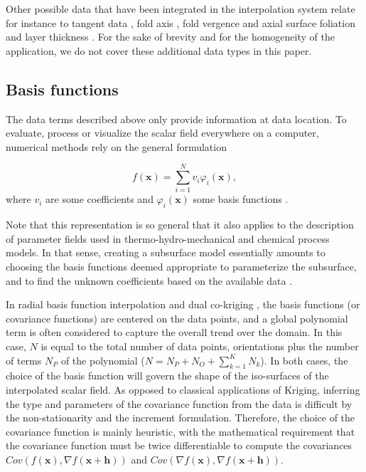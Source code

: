 \documentclass[preprint]{ring20}
\newcommand{\bx}{\mathbf{x}}
\begin{document}
Other possible data that have been integrated in the interpolation system relate for instance to tangent data \citep{Lajaunie1997MG, Caumon2013GaRSITo, Hillier2014MG}, fold axis \citep{MassiotGM2010,Hillier2014MG}, fold vergence and axial surface foliation \citep{Laurent2016EaPSL,Grose2017JSG} and layer thickness \citep{Laurent2016MG}. For the sake of brevity and for the homogeneity of the application, we do not cover these additional data types in this paper. 

\subsection{Basis functions} 

The data terms described above only provide information at data location. To evaluate, process or visualize the scalar field everywhere on a computer, numerical methods rely on the general formulation 

\begin{equation}
\label{eq:basis}
  f(\mathbf{x}) = \sum_{i=1}^{N}{v_i\varphi_i(\mathbf{x})},
\end{equation}
\noindent where $v_i$ are some coefficients and $\varphi_i(\mathbf{x})$ some basis functions \citep[e.g., ][]{Hillier2014MG,Renaudeau2019MG}.

Note that this representation is so general that it also applies to the description of parameter fields used in thermo-hydro-mechanical and chemical process models. 
In that sense, creating a subsurface model essentially amounts to choosing the basis functions deemed appropriate to parameterize the subsurface, and to find the unknown coefficients based on the available data \citep{Caumon2018HoMG,Wellmann2018AiG}.
 
In radial basis function interpolation \citep[RBF, ][]{Carr2001,Cowan2002ASGMEM,Hillier2014MG} and dual co-kriging \citep{Lajaunie1997MG}, the basis functions (or covariance functions) are centered on the data points, and a global polynomial term is often considered to capture the overall trend over the domain. In this case, $N$ is equal to the total number of data points, orientations plus the number of terms $N_P$ of the polynomial ($N = N_P + N_O + \sum_{k=1}^{K}{N_k}$). In both cases, the choice of the basis function will govern the shape of the iso-surfaces of the interpolated scalar field. As opposed to classical applications of Kriging, inferring the type and parameters of the covariance function from the data is difficult by the non-stationarity and the increment formulation. Therefore, the choice of the covariance function is mainly heuristic, with the mathematical requirement that the covariance function must be twice differentiable to compute the covariances $Cov\left(f(\bx), \nabla {f}(\bx+\mathbf{h})\right)$ and $Cov\left(\nabla f(\bx), \nabla f(\bx+\mathbf{h})\right)$. 
\end{document}

